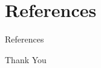 \documentclass[xcolor=dvipsnames,aspectratio=169]{beamer}
\begin{document}
	\section{References}
	\begin{frame}{References}
		\tiny
		
		\nocite{*} 
	\end{frame}
	
	\begin{frame}
		\begin{center}
			{\Huge\calligra Thank You}
		\end{center}
	\end{frame}
	
\end{document}
